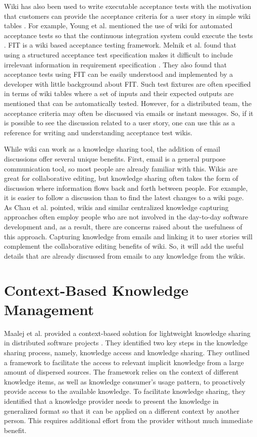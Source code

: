 Wiki has also been used to write executable acceptance tests with the motivation that customers can provide the acceptance criteria for a user story in simple wiki tables \cite{fitnesse}. For example, Young et al. mentioned the use of wiki for automated acceptance tests so that the continuous integration system could execute the tests \cite{how_did_we}. FIT is a wiki based acceptance testing framework. Melnik et al. found that using a structured acceptance test specification makes it difficult to include irrelevant information in requirement specification \cite{suitability_of}. They also found that acceptance tests using FIT can be easily understood and implemented by a developer with little background about FIT. Such test fixtures are often specified in terms of wiki tables where a set of inputs and their expected outputs are mentioned that can be automatically tested. However, for a distributed team, the acceptance criteria may often be discussed via emails or instant messages. So, if it is possible to see the discussion related to a user story, one can use this as a reference for writing and understanding acceptance test wikis. 

While wiki can work as a knowledge sharing tool, the addition of email discussions offer several unique benefits. First, email is a general purpose communication tool, so most people are already familiar with this. Wikis are great for collaborative editing, but knowledge sharing often takes the form of discussion where information flows back and forth between people. For example, it is easier to follow a discussion than to find the latest changes to a  wiki page. As Chau et al. pointed, wikis and similar centralized knowledge capturing approaches often employ people who are not involved in the day-to-day software development and, as a result, there are concerns raised about the usefulness of this approach\cite{a_case_study_of_wiki}. Capturing knowledge from emails and linking it to user stories will complement the collaborative editing benefits of wiki. So, it will add the useful details that are already discussed from emails to any knowledge from the wikis.

\section{Context-Based Knowledge Management}
Maalej et al. provided a context-based solution for lightweight knowledge sharing in distributed software projects \cite{a_lightweight}. They identified two key steps in the knowledge sharing process, namely, knowledge access and knowledge sharing. They outlined a framework to facilitate the access to relevant implicit knowledge from a large amount of dispersed sources. The framework relies on the context of different knowledge items, as well as knowledge consumer's usage pattern, to proactively provide access to the available knowledge. To facilitate knowledge sharing, they identified that a knowledge provider needs to present the knowledge in generalized format so that it can be applied on a different context by another person. This requires additional effort from the provider without much immediate benefit.

